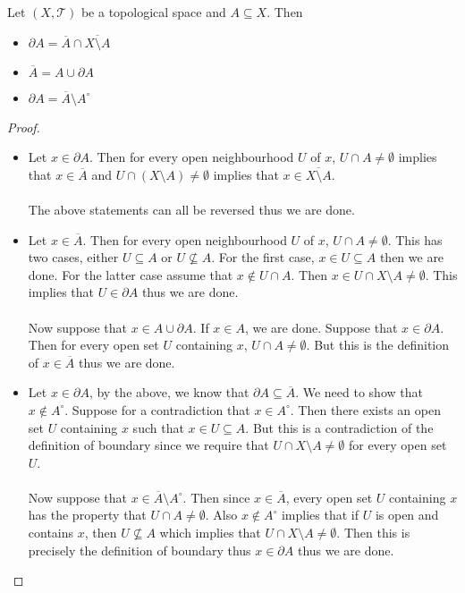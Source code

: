 \documentclass[a4paper]{article}
\begin{document}
\begin{prp}{}{} Let $(X,\mathcal{T})$ be a topological space and $A\subseteq X$. Then 
\begin{itemize}
\item $\partial A=\overline{A}\cap\overline{X\setminus A}$
\item $\overline{A}=A\cup\partial A$
\item $\partial A=\overline{A}\setminus A^\circ$
\end{itemize} \tcbline
\begin{proof}~\\
\begin{itemize}
\item Let $x\in\partial A$. Then for every open neighbourhood $U$ of $x$, $U\cap A\neq\emptyset$ implies that $x\in\overline{A}$ and $U\cap(X\setminus A)\neq\emptyset$ implies that $x\in\overline{X\setminus A}$. \\~\\
The above statements can all be reversed thus we are done. 
\item Let $x\in\overline{A}$. Then for every open neighbourhood $U$ of $x$, $U\cap A\neq\emptyset$. This has two cases, either $U\subseteq A$ or $U\not\subseteq A$. For the first case, $x\in U\subseteq A$ then we are done. For the latter case assume that $x\notin U\cap A$. Then $x\in U\cap X\setminus A\neq\emptyset$. This implies that $U\in\partial A$ thus we are done. \\~\\
Now suppose that $x\in A\cup\partial A$. If $x\in A$, we are done. Suppose that $x\in\partial A$. Then for every open set $U$ containing $x$, $U\cap A\neq\emptyset$. But this is the definition of $x\in\overline{A}$ thus we are done. 
\item Let $x\in\partial A$, by the above, we know that $\partial A\subseteq\overline{A}$. We need to show that $x\notin A^\circ$. Suppose for a contradiction that $x\in A^\circ$. Then there exists an open set $U$ containing $x$ such that $x\in U\subseteq A$. But this is a contradiction of the definition of boundary since we require that $U\cap X\setminus A\neq\emptyset$ for every open set $U$. \\~\\
Now suppose that $x\in\overline{A}\setminus A^\circ$. Then since $x\in\overline{A}$, every open set $U$ containing $x$ has the property that $U\cap A\neq\emptyset$. Also $x\notin A^\circ$ implies that if $U$ is open and contains $x$, then $U\not\subseteq A$ which implies that $U\cap X\setminus A\neq\emptyset$. Then this is precisely the definition of boundary thus $x\in\partial A$ thus we are done. 
\end{itemize}
\end{proof}
\end{prp}
\end{document}
